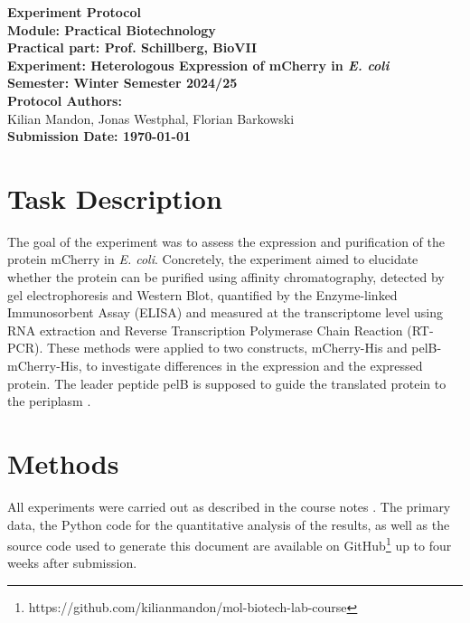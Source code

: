 \documentclass[a4paper,12pt]{article}
\begin{document}
\begin{titlepage}
    \begin{center}
        \textbf{\Huge Experiment Protocol}\\[2cm]
        
        \textbf{\LARGE Module: Practical Biotechnology}\\
        \textbf{\large Practical part: Prof. Schillberg, BioVII}\\[2cm]
        
        \textbf{\LARGE Experiment: Heterologous Expression of mCherry in \emph{E. coli}}\\[2cm]
        
        \textbf{\large Semester: Winter Semester 2024/25}\\[2cm]
        
        \textbf{\large Protocol Authors: }\\
        Kilian Mandon, Jonas Westphal, Florian Barkowski\\
        [2cm]
        
        \textbf{\large Submission Date: \today}
    \end{center}
\end{titlepage}

\newpage
\tableofcontents
\newpage

\section{Task Description}
The goal of the experiment was to assess the expression and purification of the protein mCherry in \emph{E. coli}. Concretely, the experiment aimed to elucidate whether the protein can be purified using affinity chromatography, detected by gel electrophoresis and Western Blot, quantified by the Enzyme-linked Immunosorbent Assay (ELISA) and measured at the transcriptome level using RNA extraction and Reverse Transcription Polymerase Chain Reaction (RT-PCR). These methods were applied to two constructs, mCherry-His and pelB-mCherry-His, to investigate differences in the expression and the expressed protein. The leader peptide pelB is supposed to guide the translated protein to the periplasm \cite{Sockolosky2013}. 

\section{Methods}
All experiments were carried out as described in the course notes \cite{Schillberg2025}. The primary data, the Python code for the quantitative analysis of the results, as well as the source code used to generate this document are available on GitHub\footnote{https://github.com/kilianmandon/mol-biotech-lab-course} up to four weeks after submission.
\end{document}

